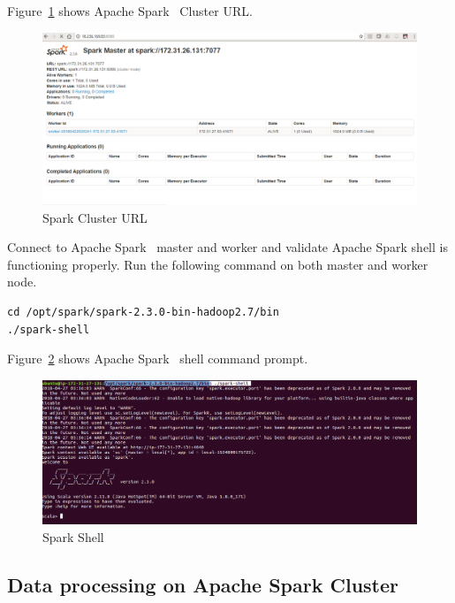 Figure~\ref{f:spark-cluster-url} shows Apache
Spark~\cite{hid-sp18-511-www-spark} Cluster URL\@.

\begin{figure}[!ht]
\centering\includegraphics[width=\columnwidth]{images/sparkclusterurl.png}
\caption{Spark Cluster URL}\label{f:spark-cluster-url}
\end{figure}

Connect to Apache Spark~\cite{hid-sp18-511-www-spark} master and worker and validate Apache Spark shell is functioning properly.
Run the following command on both master and worker node.

\begin{verbatim}
cd /opt/spark/spark-2.3.0-bin-hadoop2.7/bin
./spark-shell 
\end{verbatim}
 
Figure~\ref{f:spark-shell} shows Apache
Spark~\cite{hid-sp18-511-www-spark} shell command prompt.

\begin{figure}[!ht]
	\centering\includegraphics[width=\columnwidth]{images/sparkshell.png}
	\caption{Spark Shell}\label{f:spark-shell}
\end{figure}

\subsection{Data processing on Apache Spark Cluster}

